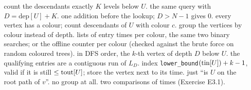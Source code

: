 \begin{variantsbox}
  {count the descendants exactly $K$ levels below $U$.}
  {the same query with $D = \mathrm{dep}[U] + K$.}
  {one addition before the lookup; $D > N-1$ gives 0.}
  {every vertex has a colour; count descendants of $U$ with colour $c$.}
  {group the vertices by colour instead of depth.}
  {lists of entry times per colour, the same two binary searches; or the offline counter per colour (checked against the brute force on random coloured trees).}
  {in DFS order, the $k$-th vertex of depth $D$ below $U$.}
  {the qualifying entries are a contiguous run of $L_D$.}
  {index \texttt{lower\_bound}$(\mathrm{tin}[U]) + k - 1$, valid if it is still $\le \mathrm{tout}[U]$; store the vertex next to its time.}
  {just ``is $U$ on the root path of $v$''.}
  {no group at all.}
  {two comparisons of times (Exercise E3.1).}
\end{variantsbox}
